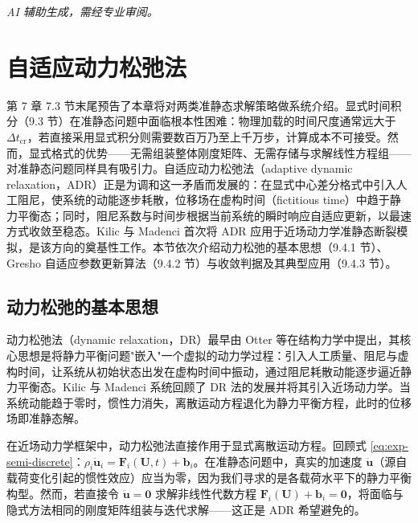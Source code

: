 \emph{AI 辅助生成，需经专业审阅。}

\section{自适应动力松弛法}\label{sec:adr}

第 7 章 7.3 节末尾预告了本章将对两类准静态求解策略做系统介绍。显式时间积分（9.3 节）在准静态问题中面临根本性困难：物理加载的时间尺度通常远大于 $\Delta t_{\text{cr}}$，若直接采用显式积分则需要数百万乃至上千万步，计算成本不可接受。然而，显式格式的优势——无需组装整体刚度矩阵、无需存储与求解线性方程组——对准静态问题同样具有吸引力。自适应动力松弛法（adaptive dynamic relaxation，ADR）正是为调和这一矛盾而发展的：在显式中心差分格式中引入人工阻尼，使系统的动能逐步耗散，位移场在虚构时间（fictitious time）中趋于静力平衡态；同时，阻尼系数与时间步根据当前系统的瞬时响应自适应更新，以最速方式收敛至稳态。Kilic 与 Madenci \cite{KilicMadenci2010} 首次将 ADR 应用于近场动力学准静态断裂模拟，是该方向的奠基性工作。本节依次介绍动力松弛的基本思想（9.4.1 节）、Gresho 自适应参数更新算法（9.4.2 节）与收敛判据及其典型应用（9.4.3 节）。

\subsection{动力松弛的基本思想}\label{sec:adr-basics}

动力松弛法（dynamic relaxation，DR）最早由 Otter 等在结构力学中提出，其核心思想是将静力平衡问题"嵌入"一个虚拟的动力学过程：引入人工质量、阻尼与虚构时间，让系统从初始状态出发在虚构时间中振动，通过阻尼耗散动能逐步逼近静力平衡态。Kilic 与 Madenci \cite{KilicMadenci2010} 系统回顾了 DR 法的发展并将其引入近场动力学。当系统动能趋于零时，惯性力消失，离散运动方程退化为静力平衡方程，此时的位移场即准静态解。

在近场动力学框架中，动力松弛法直接作用于显式离散运动方程。回顾式 \eqref{eq:exp-semi-discrete}：$\rho_i\ddot{\mathbf{u}}_i=\mathbf{F}_i(\mathbf{U},t)+\mathbf{b}_i$。在准静态问题中，真实的加速度 $\ddot{\mathbf{u}}$（源自载荷变化引起的惯性效应）应当为零，因为我们寻求的是各载荷水平下的静力平衡构型。然而，若直接令 $\ddot{\mathbf{u}}=\mathbf{0}$ 求解非线性代数方程 $\mathbf{F}_i(\mathbf{U})+\mathbf{b}_i=\mathbf{0}$，将面临与隐式方法相同的刚度矩阵组装与迭代求解——这正是 ADR 希望避免的。

